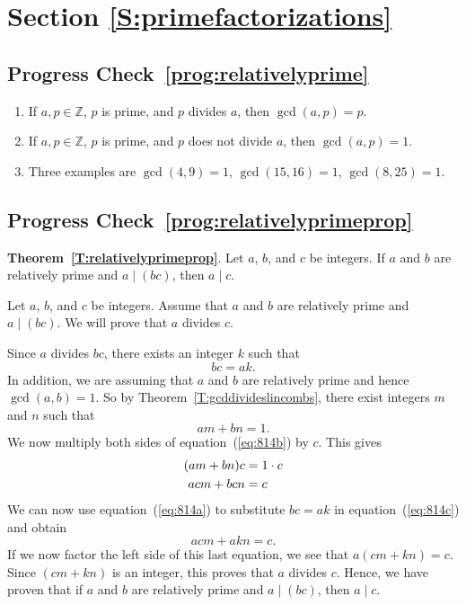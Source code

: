 \section*{Section \ref{S:primefactorizations}}

\subsection*{Progress Check~\ref{prog:relativelyprime}}
\begin{enumerate}
\item If  $a, p \in \mathbb{Z}$, $p$  is prime, and  $p$ divides  $a$, then  
$\gcd ( {a, p} ) = p$.

\item If  $a, p \in \mathbb{Z}$, $p$  is prime, and  $p$ does not divide  $a$, then  
$\gcd ( {a, p} ) = 1$.

\item Three examples are  $\gcd ( {4, 9} ) = 1$,  
$\gcd ( {15, 16} ) = 1$,  $\gcd ( {8, 25} ) = 1$.
\end{enumerate}


\subsection*{Progress Check~\ref{prog:relativelyprimeprop}}
\setcounter{equation}{0}
\noindent
\textbf{Theorem~\ref{T:relativelyprimeprop}}.  Let  $a$, $b$, and  $c$ be integers.  If  $a$  and  $b$  are relatively prime  and  $a \mid ( {bc} )$, then  $a \mid c$.

\begin{myproof}
Let  $a$, $b$, and  $c$ be integers.  Assume that  $a$  and  $b$  are relatively prime  and  
$a \mid ( {bc} )$.  We will prove that  $a$  divides  $c$.

Since  $a$  divides  $bc$, there exists an integer  $k$  such that
\begin{equation} \label{eq:814a}
bc = ak.
\end{equation}
In addition, we are assuming that  $a$  and  $b$  are relatively prime  and hence  
$\gcd ( {a, b} ) = 1$.  So by Theorem~\ref{T:gcddivideslincombs}, there exist integers  $m$  and  $n$  such that
\begin{equation} \label{eq:814b}
am + bn = 1.
\end{equation}
We now multiply both sides of equation~(\ref{eq:814b}) by  $c$.  This gives
\begin{align}
  ( {am + bn} )c &= 1 \cdot c \notag \\ 
                  acm + bcn &= c \label{eq:814c} 
\end{align} 
We can now use equation~(\ref{eq:814a}) to substitute  $bc = ak$ in equation~(\ref{eq:814c}) and obtain
\[
acm + akn = c.
\]
If we now factor the left side of this last equation, we see that  
$a( {cm + kn} ) = c$.  Since  $( {cm + kn} )$ is an integer, this proves that  $a$  divides  $c$.  Hence, we have proven that if  $a$  and  $b$  are relatively prime  and  $a \mid ( {bc} )$, then  $a \mid c$.
\end{myproof}

\hbreak

\endinput
